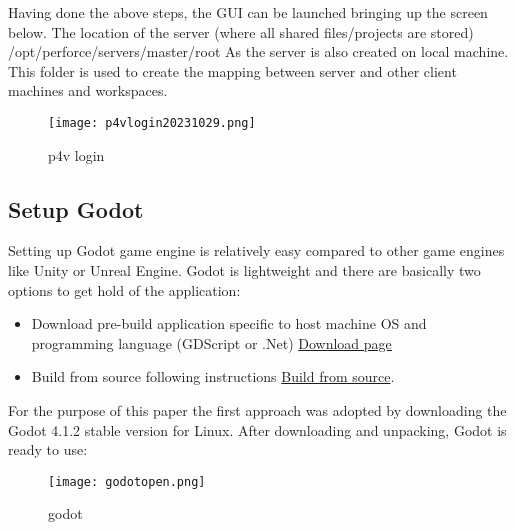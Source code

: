 Having done the above steps, the GUI can be launched bringing up the screen below. The location of the server (where
all shared files/projects are stored) \colorbox{blue!30}{/opt/perforce/servers/master/root} 
As the server is also created on local machine. This folder is used to create the mapping between server and other 
client machines and workspaces.
\begin{figure}[H]
    \centering
    \texttt{[image: p4vlogin20231029.png]}
      \caption{p4v login}
      \label{fig:p4v login}
\end{figure}

\subsection{Setup Godot}
Setting up Godot game engine is relatively easy compared to other game engines like Unity\textsuperscript{\texttrademark}
or Unreal Engine\textsuperscript{\texttrademark}. Godot is lightweight and there are basically two options to get hold
of the application:
\begin{itemize}
    \item Download pre-build application specific to host machine OS and programming language (GDScript or .Net)
    \href{https://godotengine.org/download/linux/}{\color{blue}Download page}
    \item Build from source following instructions 
    \href{https://docs.godotengine.org/en/stable/contributing/development/compiling/index.html}{\color{blue}Build from source}.
\end{itemize}
For the purpose of this paper the first approach was adopted by downloading the Godot 4.1.2 stable version for Linux.
After downloading and unpacking, Godot is ready to use:
\begin{figure}[H]
    \centering
    \texttt{[image: godotopen.png]}
      \caption{godot}
      \label{fig:godot}
\end{figure}

